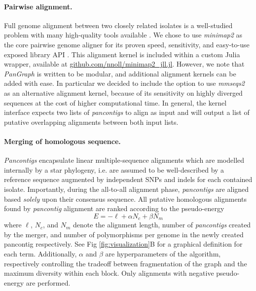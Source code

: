 \documentclass[aps,rmp,reprint,superscriptaddress,notitlepage,10pt]{revtex4-1}
\begin{document}
\paragraph{Pairwise alignment.}
Full genome alignment between two closely related isolates is a well-studied problem with many high-quality tools available \cite{li2018minimap2,marccais2018mummer4}.
We chose to use \emph{minimap2} as the core pairwise genome aligner for its proven speed, sensitivity, and easy-to-use exposed library API \cite{li2018minimap2}.
This alignment kernel is included within a custom Julia wrapper, available at \url{github.com/nnoll/minimap2_jll.jl}.
However, we note that \emph{PanGraph} is written to be modular, and additional alignment kernels can be added with ease.
In particular we decided to include the option to use \emph{mmseqs2} \cite{steinegger2017mmseqs2} as an alternative alignment kernel, because of its sensitivity on highly diverged sequences at the cost of higher computational time.
In general, the kernel interface expects two lists of \emph{pancontigs} to align as input and will output a list of putative overlapping alignments between both input lists.

\paragraph{Merging of homologous sequence.}
\emph{Pancontigs} encapsulate linear multiple-sequence alignments which are modelled internally by a star phylogeny, i.e. are assumed to be well-described by a reference sequence augmented by independent SNPs and indels for each contained isolate.
Importantly, during the all-to-all alignment phase, \emph{pancontigs} are aligned based \emph{solely} upon their consensus sequence.
All putative homologous alignments found by \emph{pancontig} alignment are ranked according to the pseudo-energy
\begin{equation}\label{eq:pseudo-energy}
    E = -\ell + \alpha N_c + \beta N_m
\end{equation}
where $\ell$, $N_c$, and $N_m$ denote the alignment length, number of \emph{pancontigs} created by the merger, and number of polymorphisms per genome in the newly created {pancontig} respectively.
See Fig \ref{fig:visualization}B for a graphical definition for each term.
Additionally, $\alpha$ and $\beta$ are hyperparameters of the algorithm, respectively controlling the tradeoff between fragmentation of the graph and the maximum diversity within each block.
Only alignments with negative pseudo-energy are performed.
\end{document}
